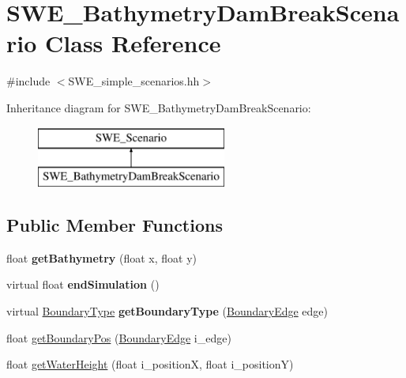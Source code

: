 \hypertarget{classSWE__BathymetryDamBreakScenario}{\section{S\-W\-E\-\_\-\-Bathymetry\-Dam\-Break\-Scenario Class Reference}
\label{classSWE__BathymetryDamBreakScenario}
}


{\ttfamily \#include $<$S\-W\-E\-\_\-simple\-\_\-scenarios.\-hh$>$}

Inheritance diagram for S\-W\-E\-\_\-\-Bathymetry\-Dam\-Break\-Scenario\-:\begin{figure}[H]
\begin{center}
\leavevmode
\includegraphics[height=2.000000cm]{classSWE__BathymetryDamBreakScenario}
\end{center}
\end{figure}
\subsection*{Public Member Functions}
\begin{DoxyCompactItemize}
\item 
\hypertarget{classSWE__BathymetryDamBreakScenario_abbc8b6d317163f21d2e9d46f67a6465f}{float {\bfseries get\-Bathymetry} (float x, float y)}\label{classSWE__BathymetryDamBreakScenario_abbc8b6d317163f21d2e9d46f67a6465f}

\item 
\hypertarget{classSWE__BathymetryDamBreakScenario_a29a5d3d82ad7092504b79a263c766feb}{virtual float {\bfseries end\-Simulation} ()}\label{classSWE__BathymetryDamBreakScenario_a29a5d3d82ad7092504b79a263c766feb}

\item 
\hypertarget{classSWE__BathymetryDamBreakScenario_ac7a07d56d659238c0dc099c6251e265b}{virtual \hyperlink{SWE__Scenario_8hh_af75d5dd7322fa39ed0af4e7839e600f8}{Boundary\-Type} {\bfseries get\-Boundary\-Type} (\hyperlink{SWE__Scenario_8hh_aa5e01e3f7df312f7b9b0d02521141fcc}{Boundary\-Edge} edge)}\label{classSWE__BathymetryDamBreakScenario_ac7a07d56d659238c0dc099c6251e265b}

\item 
float \hyperlink{classSWE__BathymetryDamBreakScenario_aa861ba2d4d7e71509f78e1d4d4cb82c7}{get\-Boundary\-Pos} (\hyperlink{SWE__Scenario_8hh_aa5e01e3f7df312f7b9b0d02521141fcc}{Boundary\-Edge} i\-\_\-edge)
\item 
float \hyperlink{classSWE__BathymetryDamBreakScenario_aa903538480526b092fff75160d7e225c}{get\-Water\-Height} (float i\-\_\-position\-X, float i\-\_\-position\-Y)
\end{DoxyCompactItemize}
